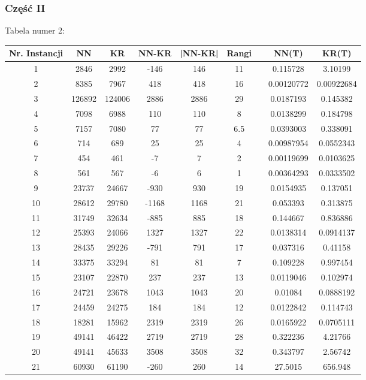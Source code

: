 \documentclass{article}
\begin{document}
\subsubsection{Część II}
Tabela numer 2:
\begin{table}[h!]
\centering
\begin{tabular}{c||c|c||c|c||c c c|c}
Nr. Instancji & NN & KR & NN-KR & |NN-KR| & Rangi & & NN(T) & KR(T)\\
\hline
1 & 2846 & 2992 & -146 & 146 & 11 &  & 0.115728 & 3.10199 \\
2 & 8385 & 7967 & 418 & 418 & 16 &  & 0.00120772 & 0.00922684 \\
3 & 126892 & 124006 & 2886 & 2886 & 29 &  & 0.0187193 & 0.145382 \\
4 & 7098 & 6988 & 110 & 110 & 8 &  & 0.0138299 & 0.184798 \\
5 & 7157 & 7080 & 77 & 77 & 6.5 &  & 0.0393003 & 0.338091 \\
6 & 714 & 689 & 25 & 25 & 4 &  & 0.00987954 & 0.0552343 \\
7 & 454 & 461 & -7 & 7 & 2 &  & 0.00119699 & 0.0103625 \\
8 & 561 & 567 & -6 & 6 & 1 &  & 0.00364293 & 0.0333502 \\
9 & 23737 & 24667 & -930 & 930 & 19 &  & 0.0154935 & 0.137051 \\
10 & 28612 & 29780 & -1168 & 1168 & 21 &  & 0.053393 & 0.313875 \\
11 & 31749 & 32634 & -885 & 885 & 18 &  & 0.144667 & 0.836886 \\
12 & 25393 & 24066 & 1327 & 1327 & 22 &  & 0.0138314 & 0.0914137 \\
13 & 28435 & 29226 & -791 & 791 & 17 &  & 0.037316 & 0.41158 \\
14 & 33375 & 33294 & 81 & 81 & 7 &  & 0.109228 & 0.997454 \\
15 & 23107 & 22870 & 237 & 237 & 13 &  & 0.0119046 & 0.102974 \\
16 & 24721 & 23678 & 1043 & 1043 & 20 &  & 0.01084 & 0.0888192 \\
17 & 24459 & 24275 & 184 & 184 & 12 &  & 0.0122842 & 0.114743 \\
18 & 18281 & 15962 & 2319 & 2319 & 26 &  & 0.0165922 & 0.0705111 \\
19 & 49141 & 46422 & 2719 & 2719 & 28 &  & 0.322236 & 4.21766 \\
20 & 49141 & 45633 & 3508 & 3508 & 32 &  & 0.343797 & 2.56742 \\
21 & 60930 & 61190 & -260 & 260 & 14 &  & 27.5015 & 656.948 \\

\end{tabular}
\end{table}
\end{document}

